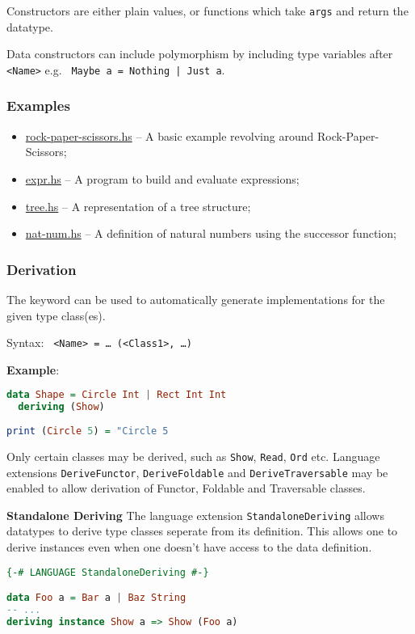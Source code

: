 Constructors are either plain values, or functions which take \texttt{args} and return the datatype.

Data constructors can include polymorphism by including type variables after \texttt{<Name>} e.g. \texttt{ Maybe a = Nothing | Just a}.

\subsubsection{Examples}
\begin{itemize}
  \item \url{rock-paper-scissors.hs} -- A basic example revolving around Rock-Paper-Scissors;
  \item \url{expr.hs} -- A program to build and evaluate expressions;
  \item \url{tree.hs} -- A representation of a tree structure;
  \item \url{nat-num.hs} -- A definition of natural numbers using the successor function;
\end{itemize}

\subsubsection{Derivation}
The \texttt{} keyword can be used to automatically generate implementations for the given type class(es).

Syntax: \texttt{ <Name> = \ldots {} (<Class1>, \ldots)}

\textbf{Example}:
\begin{lstlisting}[language=haskell]
data Shape = Circle Int | Rect Int Int
  deriving (Show)
  
print (Circle 5) = "Circle 5
\end{lstlisting}

Only certain classes may be derived, such as \texttt{Show}, \texttt{Read}, \texttt{Ord} etc.
Language extensions \texttt{DeriveFunctor}, \texttt{DeriveFoldable} and \texttt{DeriveTraversable} may be enabled to allow derivation of Functor, Foldable and Traversable classes.

\textbf{Standalone Deriving}
The language extension \texttt{StandaloneDeriving} allows datatypes to derive type classes seperate from its definition. This allows one to derive instances even when one doesn't have access to the data definition.
\begin{lstlisting}[language=haskell]
{-# LANGUAGE StandaloneDeriving #-}

data Foo a = Bar a | Baz String
-- ...
deriving instance Show a => Show (Foo a)
\end{lstlisting}

